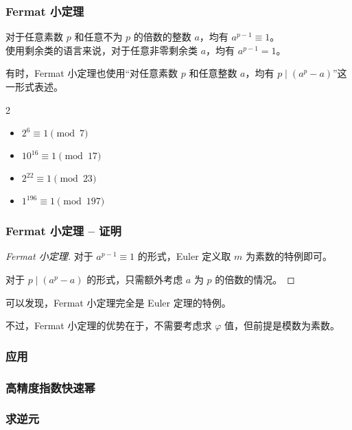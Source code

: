 \documentclass{../pkslide}
\begin{document}
\begin{frame}
  \frametitle{Fermat 小定理}
  \begin{theorem}
    对于任意素数 $p$ 和任意不为 $p$ 的倍数的整数 $a$，均有 $a^{p - 1} \equiv 1$。\\
    使用剩余类的语言来说，对于任意非零剩余类 $a$，均有 $a^{p - 1} = 1$。
    
    \emptyline
    有时，Fermat 小定理也使用“对任意素数 $p$ 和任意整数 $a$，均有 $p \mid (a^p - a)$”这一形式表述。
  \end{theorem}
  
  \pause
  \begin{example}
    \begin{mymulticols}[l][l]{2}
      \begin{itemize}
        \item $2^6 \equiv 1 \pmod{7}$
        \item $10^{16} \equiv 1 \pmod{17}$
        \item $2^{22} \equiv 1 \pmod{23}$
        \item $1^{196} \equiv 1 \pmod{197}$
      \end{itemize}
    \end{mymulticols}
  \end{example}
\end{frame}

\begin{frame}
  \frametitle{Fermat 小定理 -- 证明}
  \begin{proof}[Fermat 小定理]
    对于 $a^{p - 1} \equiv 1$ 的形式，Euler 定义取 $m$ 为素数的特例即可。
    
    对于 $p \mid (a^p - a)$ 的形式，只需额外考虑 $a$ 为 $p$ 的倍数的情况。
  \end{proof}
  
  \pause
  可以发现，Fermat 小定理完全是 Euler 定理的特例。
  
  不过，Fermat 小定理的优势在于，不需要考虑求 $\varphi$ 值，但前提是模数为素数。
\end{frame}

\subsubsection{应用}

\begin{frame}
  \frametitle{高精度指数快速幂}
\end{frame}

\begin{frame}
  \frametitle{求逆元}
\end{frame}
\end{document}
